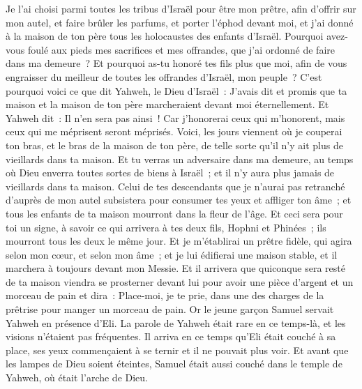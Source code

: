\begin{multicols}{2}
Je l'ai choisi parmi toutes les tribus d'Israël pour être mon prêtre, afin d'offrir sur mon autel, et faire brûler les parfums, et porter l'éphod devant moi, et j'ai donné à la maison de ton père tous les holocaustes des enfants d'Israël.
Pourquoi avez-vous foulé aux pieds mes sacrifices et mes offrandes, que j'ai ordonné de faire dans ma demeure~? Et pourquoi as-tu honoré tes fils plus que moi, afin de vous engraisser du meilleur de toutes les offrandes d'Israël, mon peuple~?
C'est pourquoi voici ce que dit Yahweh, le Dieu d'Israël~: J'avais dit et promis que ta maison et la maison de ton père marcheraient devant moi éternellement. Et Yahweh dit~: Il n'en sera pas ainsi~! Car j'honorerai ceux qui m'honorent, mais ceux qui me méprisent seront méprisés.
Voici, les jours viennent où je couperai ton bras, et le bras de la maison de ton père, de telle sorte qu'il n'y ait plus de vieillards dans ta maison.
Et tu verras un adversaire dans ma demeure, au temps où Dieu enverra toutes sortes de biens à Israël~; et il n'y aura plus jamais de vieillards dans ta maison.
Celui de tes descendants que je n'aurai pas retranché d'auprès de mon autel subsistera pour consumer tes yeux et affliger ton âme~; et tous les enfants de ta maison mourront dans la fleur de l'âge.
Et ceci sera pour toi un signe, à savoir ce qui arrivera à tes deux fils, Hophni et Phinées~; ils mourront tous les deux le même jour.
Et je m'établirai un prêtre fidèle, qui agira selon mon cœur, et selon mon âme~; et je lui édifierai une maison stable, et il marchera à toujours devant mon Messie.
Et il arrivera que quiconque sera resté de ta maison viendra se prosterner devant lui pour avoir une pièce d'argent et un morceau de pain et dira~: Place-moi, je te prie, dans une des charges de la prêtrise pour manger un morceau de pain.
\VerseOne{}Or le jeune garçon Samuel servait Yahweh en présence d'Eli. La parole de Yahweh était rare en ce temps-là, et les visions n'étaient pas fréquentes.
Il arriva en ce temps qu'Eli était couché à sa place, ses yeux commençaient à se ternir et il ne pouvait plus voir.
Et avant que les lampes de Dieu soient éteintes, Samuel était aussi couché dans le temple de Yahweh, où était l'arche de Dieu.

\end{multicols}
